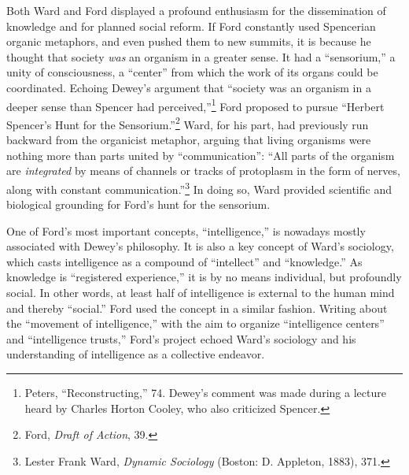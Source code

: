 \documentclass[twoside,symmetric,nobib,justified]{tufte-book}
\begin{document}
Both Ward and Ford displayed a profound enthusiasm for the dissemination
of knowledge and for planned social reform. If Ford constantly used
Spencerian organic metaphors, and even pushed them to new summits, it is
because he thought that society \emph{was} an organism in a greater
sense. It had a ``sensorium,'' a unity of consciousness, a ``center''
from which the work of its organs could be coordinated. Echoing Dewey's
argument that ``society was an organism in a deeper sense than Spencer
had perceived,''\footnote{Peters, ``Reconstructing,'' 74. Dewey's
  comment was made during a lecture heard by Charles Horton Cooley, who
  also criticized Spencer.} Ford proposed to pursue ``Herbert Spencer's
Hunt for the Sensorium.''\footnote{Ford, \emph{Draft of Action}, 39.}
Ward, for his part, had previously run backward from the organicist
metaphor, arguing that living organisms were nothing more than parts
united by ``communication'': ``All parts of the organism are
\emph{integrated} by means of channels or tracks of protoplasm in the
form of nerves, along with constant communication.''\footnote{Lester
  Frank Ward, \emph{Dynamic Sociology} (Boston: D. Appleton, 1883), 371.}
In doing so, Ward provided scientific and biological grounding for
Ford's hunt for the sensorium.

One of Ford's most important concepts, ``intelligence,'' is nowadays
mostly associated with Dewey's philosophy. It is also a key concept of
Ward's sociology, which casts intelligence as a compound of
``intellect'' and ``knowledge.'' As knowledge is ``registered
experience,'' it is by no means individual, but profoundly social. In
other words, at least half of intelligence is external to the human mind
and thereby ``social.'' Ford used the concept in a similar fashion.
Writing about the ``movement of intelligence,'' with the aim to organize
``intelligence centers'' and ``intelligence trusts,'' Ford's project
echoed Ward's sociology and his understanding of intelligence as a
collective endeavor.
\end{document}
